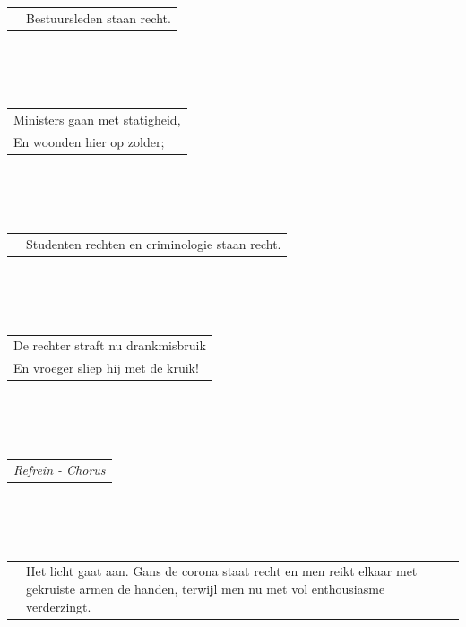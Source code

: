 \documentclass[a4paper, 14pt]{extarticle}
\begin{document}
\\\\\\
\begin{tabularx}{\textwidth} {
   c >{\raggedright\arraybackslash}X}
    \hspace{5mm} & {\small Bestuursleden staan recht.}\\
\end{tabularx}
\\\\\\
\begin{tabularx}{0.7\textwidth} {
   >{\raggedright\arraybackslash}X }
Ministers gaan met statigheid, \\
En woonden hier op zolder; \\
\end{tabularx}
\\\\\\
\begin{tabularx}{\textwidth} {
   c >{\raggedright\arraybackslash}X}
    \hspace{5mm} & {\small Studenten rechten en criminologie staan recht.}\\
\end{tabularx}
\\\\\\
\begin{tabularx}{0.7\textwidth} {
   >{\raggedright\arraybackslash}X }
De rechter straft nu drankmisbruik \\
En vroeger sliep hij met de kruik! \\
\end{tabularx}
\\\\\\
\begin{tabularx}{0.7\textwidth} {
   >{\raggedright\arraybackslash}X }
   \textit{Refrein - Chorus}\\
\end{tabularx}
\\\\\\
\begin{tabularx}{\textwidth} {
   c >{\raggedright\arraybackslash}X}
    \hspace{5mm} & {\small Het licht gaat aan. Gans de corona staat recht en men reikt elkaar
met gekruiste armen de handen, terwijl men nu met vol enthousiasme
verderzingt.}\\
\end{tabularx}
\end{document}
